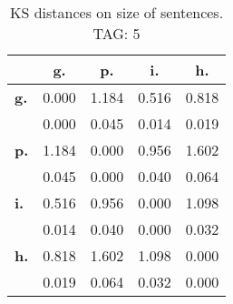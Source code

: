\begin{table}[h!]
\begin{center}
\begin{tabular}{| l || c | c | c | c |}\hline
 & {\bf g.} & {\bf p.} & {\bf i.} & {\bf h.} \\\hline\hline
{\bf g.} & 0.000 & 1.184 & 0.516 & 0.818 \\
{\bf } & 0.000 & 0.045 & 0.014 & 0.019 \\\hline
{\bf p.} & 1.184 & 0.000 & 0.956 & 1.602 \\
{\bf } & 0.045 & 0.000 & 0.040 & 0.064 \\\hline
{\bf i.} & 0.516 & 0.956 & 0.000 & 1.098 \\
{\bf } & 0.014 & 0.040 & 0.000 & 0.032 \\\hline
{\bf h.} & 0.818 & 1.602 & 1.098 & 0.000 \\
{\bf } & 0.019 & 0.064 & 0.032 & 0.000 \\\hline
\end{tabular}
\caption{KS distances on size of sentences. TAG: 5}
\end{center}
\end{table}